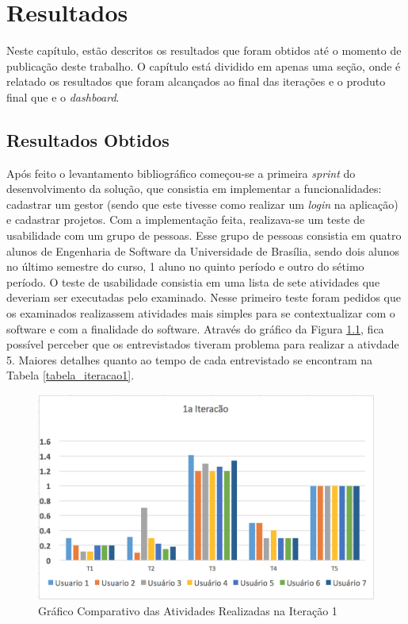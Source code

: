 \chapter[Resultados]{Resultados}
\label{sec:resultados}
Neste capítulo, estão descritos os resultados que foram obtidos até o momento de publicação deste trabalho. O capítulo está dividido em apenas uma seção, onde é relatado os resultados que foram alcançados ao final das iterações e o produto final que e o \textit{dashboard}.

\section{Resultados Obtidos}
\label{resultados_obtidos}

Após feito o levantamento bibliográfico começou-se a primeira \textit{sprint} do desenvolvimento da solução, que consistia em implementar a funcionalidades: cadastrar um gestor (sendo que este tivesse como realizar um \textit{login} na aplicação) e cadastrar projetos. Com a implementação feita, realizava-se um teste de usabilidade com um grupo de pessoas. Esse grupo de pessoas consistia em quatro alunos de Engenharia de Software da Universidade de Brasília, sendo dois alunos no último semestre do curso, 1 aluno no quinto período e outro do sétimo período. O teste de usabilidade consistia em uma lista de sete atividades que deveriam ser executadas pelo examinado. Nesse primeiro teste foram pedidos que os examinados realizassem atividades mais simples para se contextualizar com o software e com a finalidade do software. Através do gráfico da Figura \ref{img:grafico_iteracao1}, fica possível perceber que os entrevistados tiveram problema para realizar a ativdade 5. Maiores detalhes quanto ao tempo de cada entrevistado se encontram na Tabela \ref{tabela_iteracao1}.

\graphicspath{{figuras/}}
\begin{figure}[!h]
\centering
\includegraphics[scale=0.75]{iteracao1_grafico}
\caption{Gráfico Comparativo das Atividades Realizadas na Iteração 1}
\label{img:grafico_iteracao1}
\end{figure}

